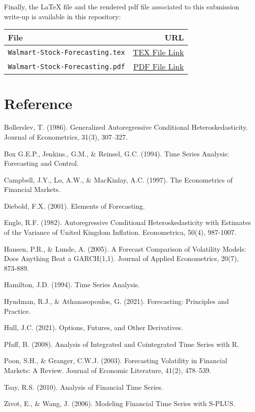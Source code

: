 \documentclass{article}
\newcommand{\1}{\mathbbm{1}}
\theoremstyle{definition}
\begin{document}
Finally, the LaTeX file and the rendered pdf file associated to this submission write-up is available in this repository:

\begin{table}[H]
\centering
\begin{tabular}{l|r}
\hline
\textbf{File}  & \textbf{URL} \\
\hline
\texttt{Walmart-Stock-Forecasting.tex} & \href{https://github.com/Stochastic1017/Walmart-Stock-Forecasting/blob/main/Rmd/Walmart-Stock-Forecasting.Rmd}{TEX File Link} \\
\texttt{Walmart-Stock-Forecasting.pdf} & \href{https://github.com/Stochastic1017/Walmart-Stock-Forecasting/blob/main/Rmd/Walmart-Stock-Forecasting.pdf}{PDF File Link} \\
\hline
\end{tabular}
\end{table}







\newpage
\section*{Reference}

Bollerslev, T. (1986). Generalized Autoregressive Conditional Heteroskedasticity.
Journal of Econometrics, 31(3), 307–327.

Box G.E.P., Jenkins., G.M., \& Reinsel, G.C. (1994). Time Series Analysis: Forecasting and Control.

Campbell, J.Y., Lo, A.W., \& MacKinlay, A.C. (1997). The Econometrics of Financial Markets.

Diebold, F.X. (2001). Elements of Forecasting.

Engle, R.F. (1982). Autoregressive Conditional Heteroskedasticity with Estimates of the Variance of United Kingdom Inflation. Econometrica, 50(4), 987-1007.

Hansen, P.R., \& Lunde, A. (2005). A Forecast Comparison of Volatility Models: Does Anything Beat a GARCH(1,1). Journal of Applied Econometrics, 20(7), 873-889.

Hamilton, J.D. (1994). Time Series Analysis.

Hyndman, R.J., \& Athanasopoulos, G. (2021). Forecasting: Principles and Practice.

Hull, J.C. (2021). Options, Futures, and Other Derivatives.

Pfaff, B. (2008). Analysis of Integrated and Cointegrated Time Series with R.

Poon, S.H., \& Granger, C.W.J. (2003). Forecasting Volatility in Financial Markets: A Review.
Journal of Economic Literature, 41(2), 478–539.

Tsay, R.S. (2010). Analysis of Financial Time Series.

Zivot, E., \& Wang, J. (2006). Modeling Financial Time Series with S-PLUS.
\end{document}
